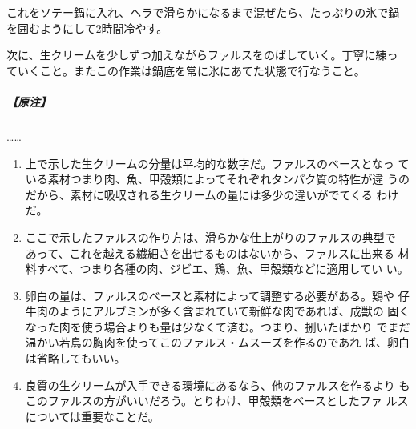 \begin{recette}
これをソテー鍋に入れ、ヘラで滑らかになるまで混ぜたら、たっぷりの氷で鍋
を囲むようにして2時間冷やす。

次に、生クリームを少しずつ加えながらファルスをのばしていく。丁寧に練っ
ていくこと。またこの作業は鍋底を常に氷にあてた状態で行なうこと。

\hypertarget{ux539fux6ce8-2}{%
\subparagraph{【原注】}\label{ux539fux6ce8-2}}

\ldots{}\ldots{}

\begin{enumerate}
\def\labelenumi{\arabic{enumi}.}
\item
  上で示した生クリームの分量は平均的な数字だ。ファルスのベースとなっ
  ている素材つまり肉、魚、甲殻類によってそれぞれタンパク質の特性が違
  うのだから、素材に吸収される生クリームの量には多少の違いがでてくる
  わけだ。
\item
  ここで示したファルスの作り方は、滑らかな仕上がりのファルスの典型で
  あって、これを越える繊細さを出せるものはないから、ファルスに出来る
  材料すべて、つまり各種の肉、ジビエ、鶏、魚、甲殻類などに適用してい
  い。
\item
  卵白の量は、ファルスのベースと素材によって調整する必要がある。鶏や
  仔牛肉のようにアルブミンが多く含まれていて新鮮な肉であれば、成獣の
  固くなった肉を使う場合よりも量は少なくて済む。つまり、捌いたばかり
  でまだ温かい若鳥の胸肉を使ってこのファルス・ムスーズを作るのであれ
  ば、卵白は省略してもいい。
\item
  良質の生クリームが入手できる環境にあるなら、他のファルスを作るより
  もこのファルスの方がいいだろう。とりわけ、甲殻類をベースとしたファ
  ルスについては重要なことだ。
\end{enumerate}
\end{recette}

